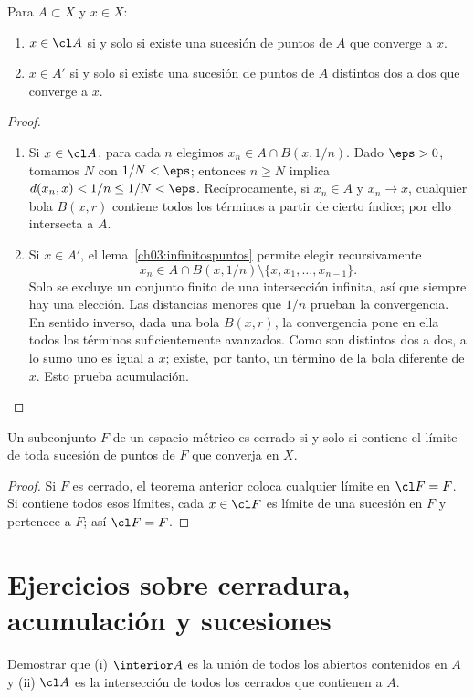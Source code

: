 \begin{teorema}\label{ch03:secuencial}
Para $A\subset X$ y $x\in X$:
\begin{enumerate}[label=(\roman*)]
\item $x\in\cl A$ si y solo si existe una sucesión de puntos de $A$ que converge a $x$.
\item $x\in A'$ si y solo si existe una sucesión de puntos de $A$ distintos dos a dos que converge a $x$.
\end{enumerate}
\end{teorema}
\begin{proof}
\begin{enumerate}[label=(\roman*)]
\item Si $x\in\cl A$, para cada $n$ elegimos $x_n\in A\cap B(x,1/n)$. Dado $\eps>0$, tomamos $N$ con $1/N<\eps$; entonces $n\ge N$ implica $d(x_n,x)<1/n\le1/N<\eps$. Recíprocamente, si $x_n\in A$ y $x_n\to x$, cualquier bola $B(x,r)$ contiene todos los términos a partir de cierto índice; por ello intersecta a $A$.
\item Si $x\in A'$, el lema~\ref{ch03:infinitospuntos} permite elegir recursivamente
\[
x_n\in A\cap B(x,1/n)\setminus\{x,x_1,\ldots,x_{n-1}\}.
\]
Solo se excluye un conjunto finito de una intersección infinita, así que siempre hay una elección. Las distancias menores que $1/n$ prueban la convergencia. En sentido inverso, dada una bola $B(x,r)$, la convergencia pone en ella todos los términos suficientemente avanzados. Como son distintos dos a dos, a lo sumo uno es igual a $x$; existe, por tanto, un término de la bola diferente de $x$. Esto prueba acumulación.
\end{enumerate}
\end{proof}
\begin{corolario}\label{ch03:cerradosecuencial}
Un subconjunto $F$ de un espacio métrico es cerrado si y solo si contiene el límite de toda sucesión de puntos de $F$ que converja en $X$.
\end{corolario}
\begin{proof}
Si $F$ es cerrado, el teorema anterior coloca cualquier límite en $\cl F=F$. Si contiene todos esos límites, cada $x\in\cl F$ es límite de una sucesión en $F$ y pertenece a $F$; así $\cl F=F$.
\end{proof}

\section{Ejercicios sobre cerradura, acumulación y sucesiones}
\begin{ejercicio}\label{ej:lectura-3-1}
Demostrar que (i) $\interior A$ es la unión de todos los abiertos contenidos en $A$ y (ii) $\cl A$ es la intersección de todos los cerrados que contienen a $A$.
\end{ejercicio}


